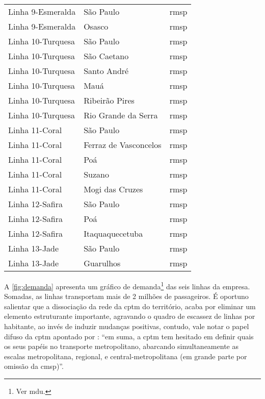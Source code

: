 \documentclass[11pt,fleqn]{book} %
\begin{document}
\begin{center}
\begin{longtable}{|l|l|l|}
		Linha 9-Esmeralda & São Paulo & \gls{rmsp} \\
		Linha 9-Esmeralda & Osasco & \gls{rmsp} \\
		Linha 10-Turquesa & São Paulo & \gls{rmsp} \\
		Linha 10-Turquesa & São Caetano & \gls{rmsp} \\
		Linha 10-Turquesa & Santo André & \gls{rmsp} \\
		Linha 10-Turquesa & Mauá & \gls{rmsp} \\
		Linha 10-Turquesa & Ribeirão Pires & \gls{rmsp} \\
		Linha 10-Turquesa & Rio Grande da Serra & \gls{rmsp} \\
		Linha 11-Coral & São Paulo & \gls{rmsp} \\
		Linha 11-Coral & Ferraz de Vasconcelos & \gls{rmsp} \\
		Linha 11-Coral & Poá & \gls{rmsp} \\
		Linha 11-Coral & Suzano & \gls{rmsp} \\
		Linha 11-Coral & Mogi das Cruzes & \gls{rmsp} \\
		Linha 12-Safira & São Paulo & \gls{rmsp} \\
		Linha 12-Safira & Poá & \gls{rmsp} \\
		Linha 12-Safira & Itaquaquecetuba & \gls{rmsp} \\
		Linha 13-Jade & São Paulo & \gls{rmsp} \\
		Linha 13-Jade & Guarulhos & \gls{rmsp} \\
		\end{longtable}
\end{center}	

A \autoref{fig:demanda} apresenta um gráfico de demanda\footnote{Ver \gls{mdu}.} das seis linhas da empresa. Somadas, as linhas transportam mais de 2 milhões de passageiros. É oportuno salientar que a dissociação da rede da \gls{cptm} do território, acaba por eliminar um elemento estruturante importante, agravando o quadro de escassez de linhas por habitante, ao invés de induzir mudanças positivas, contudo, vale notar o papel difuso da \gls{cptm} apontado por \cite[p. 122]{Isoda}: ``em suma, a \gls{cptm} tem hesitado em definir quais os seus papéis no transporte metropolitano, abarcando simultaneamente as escalas metropolitana, regional, e central-metropolitana (em grande parte por omissão da \gls{cmsp})''.

\begin{center}
	\label{fig:demanda}
\end{center}
\end{document}
